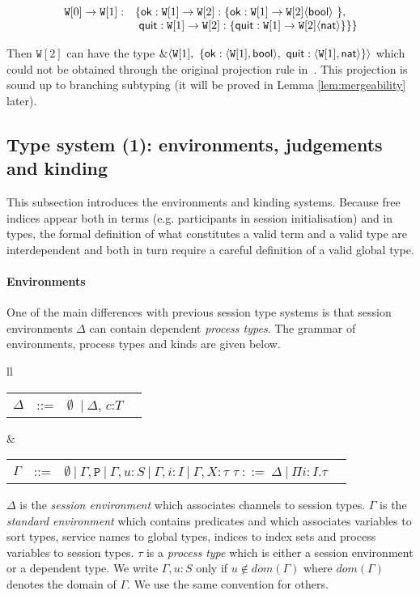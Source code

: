 \documentclass{LMCS}
\newcommand{\kf}[1]{\textup{\textsf{#1}}\xspace}
\newcommand{\ccc}{\ensuremath{c}}
\newcommand{\X}{\ensuremath{X}}
\newcommand{\sep}{\ensuremath{~\mathbf{|}~ }}
\newcommand{\Ga}{\ensuremath{\Gamma}}
\newcommand{\D}{\ensuremath{\Delta}}
\newcommand{\T}{\ensuremath{T}}
\newcommand{\ST}{\ensuremath{S}}
\newcommand{\dom}[1]{\ensuremath{dom( #1)}}
\newcommand{\Bool}{\kf{bool}}
\newcommand{\Nat}{\kf{nat}}
\newcommand{\ENCan}[1]{\langle #1 \rangle}
\newcommand{\TO}[2]{#1\to #2}
\newcommand{\ii}{\ensuremath{i}}
\newcommand{\uu}{\ensuremath{u}}
\newcommand{\II}{\ensuremath{I}}
\newcommand{\Ty}{\ensuremath{\tau}}
\newcommand{\W}{\ensuremath{\mathtt{W}}}
\newcommand{\AT}[2]{#1\! : \! #2}
\newcommand{\PRED}{\ensuremath{\mathtt{P}}}
\begin{document}
{\small\[
\begin{array}{llll}
\TO{\W[0]}{\W[1]}:& \{\mathsf{ok}:\TO{\W[1]}{\W[2]}:
\{ \mathsf{ok}:\TO{\W[1]}{\W[2]}\ENCan{\Bool} \ \}, \\
&\
\mathsf{quit}:\TO{\W[1]}{\W[2]}:\{\mathsf{quit}:\TO{\W[1]}{\W[2]}\ENCan{\Nat}\}\}\}
\end{array}
\]}

Then $\W[2]$ can have the type $\&\ENCan{\W[1], \ \{
  \mathsf{ok}:\ENCan{\W[1],\Bool}, \ \mathsf{quit}:\ENCan{\W[1],\Nat} \}}$ which
could not be obtained through the original projection rule
in~\cite{CHY07,BettiniCDLDY08LONG}.
This projection is sound 
up to branching subtyping 
(it will be proved in Lemma \ref{lem:mergeability} later).

\subsection{Type system (1): environments, judgements and kinding}
\noindent 
This subsection introduces the environments and kinding systems. 
Because free indices appear both in terms (e.g.
participants in session initialisation) and in types, the formal definition of
what constitutes a valid term and a valid type are interdependent and
both in turn require a careful definition of a valid global type.

\paragraph{\bf Environments}
One of the main differences with previous session type systems is that session
environments $\Delta$ can contain dependent {\em process types}.  The grammar of environments, process
types and kinds are given below.
\begin{center}
\small
\begin{tabular}{ll}
\begin{tabular}{rcl@{\quad}l}
\D & ::= & $\emptyset$ \sep \D, \ccc:\T\\[1mm]  
\end{tabular}
&
\begin{tabular}{rcl@{\quad}l}
$\Gamma$ & ::= & $\emptyset \sep\Gamma, \PRED \sep \Gamma, u:\ST \sep 
\Gamma, \ii:\II \sep \Gamma, \X:\Ty$
\quad 
$\Ty \ ::= \ \D \sep \Pi \AT{\ii}{\II}.\Ty$\\
\end{tabular}
\end{tabular}
\end{center}
$\D$ is the {\em session environment} 
which associates
channels to session types. 
$\Ga$ is the {\em standard environment}
which contains predicates and which associates variables to sort types, service names to global
types, indices to index sets and process variables 
to session types. 
$\Ty$ is a {\em process type} which 
is either a session environment or a 
dependent type. 
We write $\Ga,\uu:S$ only if $\uu\not\in\dom{\Gamma}$ 
where
$\dom{\Gamma}$ denotes the domain of $\Gamma$.  
We use the same convention for others.
\end{document}
